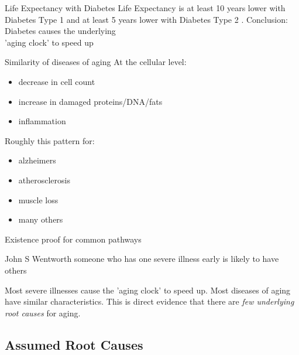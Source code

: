 \begin{frame}[c]{Life Expectancy with Diabetes}
    \large
    Life Expectancy is at least 10 years lower with Diabetes Type 1
    \cite{livingstone2015estimated} and at least 5 years lower with Diabetes Type
    2 \cite{untitled1:online}.
    \newline
    \newline
    \pause
    Conclusion: Diabetes causes the underlying \\ 'aging clock' to speed up
\end{frame}


\begin{frame}[c]{Similarity of diseases of aging}
    \large
    \cite{CorePath13:online}
    At the cellular level:
    \begin{itemize}[<+(1)->]
        \item decrease in cell count
        \item increase in damaged proteins/DNA/fats
        \item inflammation
    \end{itemize}
    \pause

    Roughly this pattern for:
    \begin{itemize}[<+(1)->]
        \item alzheimers
        \item atherosclerosis
        \item muscle loss
        \item many others
    \end{itemize}
\end{frame}


\begin{frame}[c]{Existence proof for common pathways}
    \large
    \begin{aquote}{John S Wentworth}
        someone who has one severe illness early is likely to have others
    \end{aquote}

    \pause
    Most severe illnesses cause the 'aging clock' to speed up. Most diseases of
    aging have similar characteristics. This is direct evidence that there are
    {\em few underlying root causes} for aging.
\end{frame}




\subsection{Assumed Root Causes}


